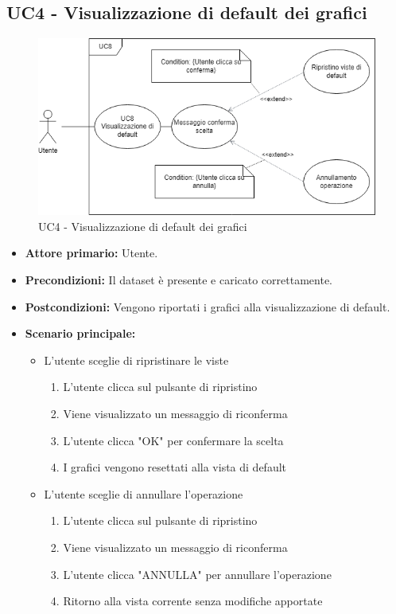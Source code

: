 \subsection{UC4 - Visualizzazione di default dei grafici}
\begin{figure}[h!]
    \centering
    \includegraphics[scale=0.55]{../../assets/visualizzazione_default.png}
	\caption{UC4 - Visualizzazione di default dei grafici}
\end{figure}

\begin{itemize}
	\item \textbf{Attore primario:} Utente.
	\item \textbf{Precondizioni:} Il dataset è presente e caricato correttamente.
	\item \textbf{Postcondizioni:} 
	Vengono riportati i grafici alla visualizzazione di default.
	\item \textbf{Scenario principale:}
	\begin{itemize}
		\item   L'utente sceglie di ripristinare le viste
	\begin{enumerate}
		\item L'utente clicca sul pulsante di ripristino
		\item Viene visualizzato un messaggio di riconferma
		\item L'utente clicca "OK" per confermare la scelta
		\item I grafici vengono resettati alla vista di default
	\end{enumerate}
		\item   L'utente sceglie di annullare l'operazione
	\begin{enumerate}
		\item L'utente clicca sul pulsante di ripristino
		\item Viene visualizzato un messaggio di riconferma
		\item L'utente clicca "ANNULLA" per annullare l'operazione
		\item Ritorno alla vista corrente senza modifiche apportate
	\end{enumerate}	
	\end{itemize}
\end{itemize}

